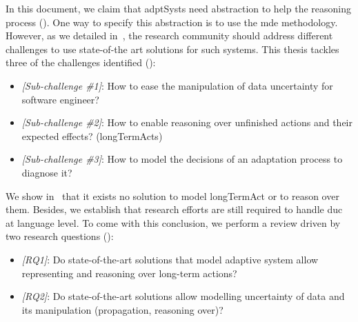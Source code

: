 In this document, we claim that \glspl{adptSyst} need abstraction to help the reasoning process (\cf {}).
One way to specify this abstraction is to use the \gls{mde} methodology.
However, as we detailed in~, the research community should address different challenges to use state-of-the art solutions for such systems.
This thesis tackles three of the challenges identified (\cf {}):
\begin{itemize}
	\item \textit{[Sub-challenge \#1]}: How to ease the manipulation of data uncertainty for software engineer?
	\item\textit{ [Sub-challenge \#2]}: How to enable reasoning over unfinished actions and their expected effects? (\glspl{longTermAct})
	\item \textit{[Sub-challenge \#3]}: How to model the decisions of an adaptation process to diagnose it?
\end{itemize}

We show in~ that it exists no solution to model \gls{longTermAct} or to reason over them.
Besides, we establish that research efforts are still required to handle \gls{duc} at language level.
To come with this conclusion, we perform a review driven by two research questions (\cf {}):
\begin{itemize}
	\item \textit{[RQ1]}: Do state-of-the-art solutions that model adaptive system allow representing and reasoning over long-term actions?
	\item \textit{[RQ2]}: Do state-of-the-art solutions allow modelling uncertainty of data and its manipulation (propagation, reasoning over)?
\end{itemize}

